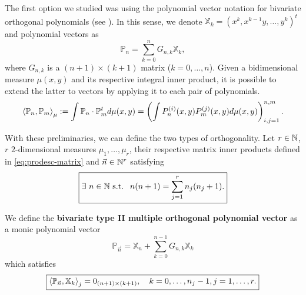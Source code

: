 \documentclass[portrait,final,a0paper,fontscale=0.38]{baposter}
\begin{document}
\begin{poster}
%
	{
  The first option we studied was using the polynomial vector notation for bivariate orthogonal polynomials (see \cite[Ch. III, Section 3.2]{xu}). In this sense, we denote $\mathbb X_k = (x^k, x^{k-1}y,\dots,y^k)^t$ and polynomial vectors as $$\mathbb P_n = \displaystyle\sum_{k=0}^n G_{n,k} \mathbb X_k,$$ where $G_{n,k}$ is a $(n+1)\times(k+1)$ matrix ($k=0,\dots,n$). Given a bidimensional measure $\mu(x,y)$ and its respective integral inner product, it is possible to extend the latter to vectors by applying it to each pair of polynomials.
  \begin{equation}
    \label{eq:prodesc-matrix}
    \left\langle \mathbb P_n , \mathbb P_m \right\rangle_\mu:= \int \mathbb P_n\cdot \mathbb P_m^t d\mu(x,y) = \left(\int P_n^{(i)}(x,y) P_m^{(j)}(x,y) d\mu(x,y)\right)_{i,j=1}^{n,m}.
  \end{equation}

  With these preliminaries, we can define the two types of orthogonality. Let $r\in\mathbb{N}$, $r$ $2$-dimensional measures $\mu_1, \dots, \mu_r$, their respective matrix inner products defined in \eqref{eq:prodesc-matrix} and $\vec n\in\mathbb{N}^r$ satisfying
  \begin{equation}
    \label{eq:condition-type-ii}
    \boxed{\exists \ n\in\mathbb{N} \text{ s.t. } \ n(n+1) = \sum_{j=1}^r n_j (n_j+1).}
  \end{equation}


  \begin{definition}
    We define the \textbf{bivariate type II multiple orthogonal polynomial vector} as a monic polynomial vector $$\mathbb P_{\vec n} = \mathbb X_n + \displaystyle\sum_{k=0}^{n-1}G_{n,k} \mathbb X_k$$ which satisfies
    \begin{equation}
        \label{eq:typeII-MOP-d-variables}
        \boxed{
        \left\langle \mathbb P_{\vec n} , \mathbb X_k \right\rangle_j = 0_{(n+1)\times (k+1)}, \ \ \ k=0,\dots,n_j-1, j=1,\dots,r.}
    \end{equation}    
  \end{definition}

}
\end{poster}
\end{document}
